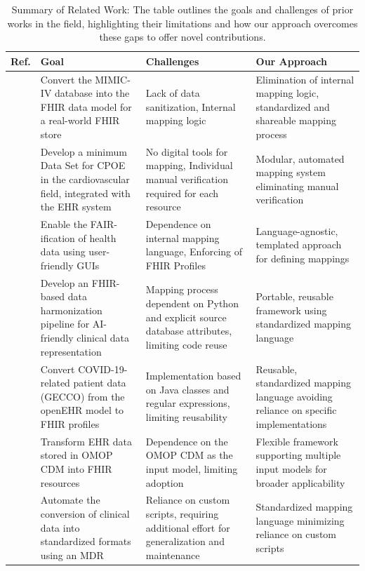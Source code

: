 \begin{table}[htbp]
    \centering
    \footnotesize
    \setlength{\tabcolsep}{3pt}
    \renewcommand{\arraystretch}{1.05}
    \caption{Summary of Related Work: The table outlines the goals and challenges of prior works in the field, highlighting their limitations and how our approach overcomes these gaps to offer novel contributions.}
    \label{tab:paper2_summary}
    \begin{tabularx}{\textwidth}{>{\centering\arraybackslash}p{} >{\raggedright\arraybackslash}p{} >{\raggedright\arraybackslash}X >{\raggedright\arraybackslash}X}
        \toprule
        \textbf{Ref.} & \textbf{Goal} & \textbf{Challenges} & \textbf{Our Approach} \\
        \midrule
        \cite{bennett2023mimic} & Convert the MIMIC-IV database into the FHIR data model for a real-world FHIR store & Lack of data sanitization, Internal mapping logic & Elimination of internal mapping logic, standardized and shareable mapping process \\
        \midrule
        \cite{montazeri2023developing} & Develop a minimum Data Set for CPOE in the cardiovascular field, integrated with the EHR system & No digital tools for mapping, Individual manual verification required for each resource & Modular, automated mapping system eliminating manual verification \\
        \midrule
        \cite{sinaci2023data} & Enable the FAIR-ification of health data using user-friendly GUIs & Dependence on internal mapping language, Enforcing of FHIR Profiles & Language-agnostic, templated approach for defining mappings \\
        \midrule
        \cite{williams2023standardized} & Develop an FHIR-based data harmonization pipeline for AI-friendly clinical data representation & Mapping process dependent on Python and explicit source database attributes, limiting code reuse & Portable, reusable framework using standardized mapping language \\
        \midrule
        \cite{ladas2022openehr} & Convert COVID-19-related patient data (GECCO) from the openEHR model to FHIR profiles & Implementation based on Java classes and regular expressions, limiting reusability & Reusable, standardized mapping language avoiding reliance on specific implementations \\
        \midrule
        \cite{soares2023omop} & Transform EHR data stored in OMOP CDM into FHIR resources & Dependence on the OMOP CDM as the input model, limiting adoption & Flexible framework supporting multiple input models for broader applicability \\
        \midrule
        \cite{simon2024metadata} & Automate the conversion of clinical data into standardized formats using an MDR & Reliance on custom scripts, requiring additional effort for generalization and maintenance & Standardized mapping language minimizing reliance on custom scripts \\
        \bottomrule
    \end{tabularx}
\end{table}


